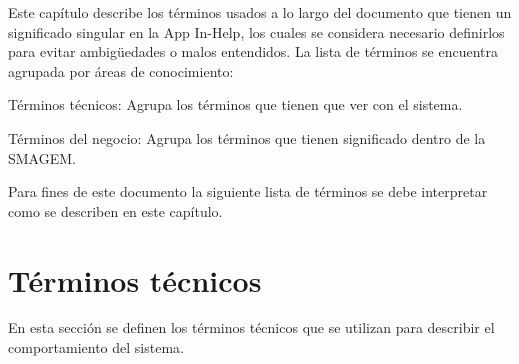 \label{sec:glosario}
    Este capítulo describe los términos usados a lo largo del documento que tienen un significado singular en la App In-Help, los cuales se considera necesario definirlos para evitar ambigüedades o malos entendidos.
    La lista de términos se encuentra agrupada por áreas de conocimiento:
\begin{Citemize}
    \item Términos técnicos: Agrupa los términos que tienen que ver con el sistema.
    \item Términos del negocio: Agrupa los términos que tienen significado dentro de la SMAGEM.
\end{Citemize}

    Para fines de este documento la siguiente lista de términos se debe interpretar como se describen en este capítulo.

   
\section{Términos técnicos}
\label{gls:terminosTecnicos}

  En esta sección se definen los términos técnicos que se utilizan para describir el comportamiento del sistema.
  
